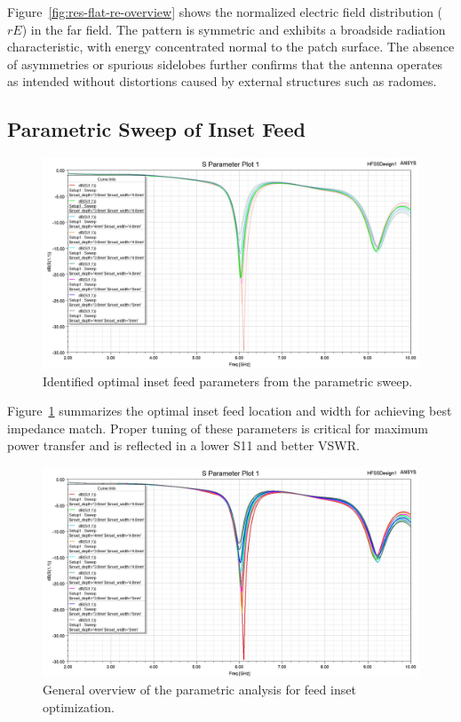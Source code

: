 Figure~\ref{fig:res-flat-re-overview} shows the normalized electric field distribution ($rE$) in the far field. The pattern is symmetric and exhibits a broadside radiation characteristic, with energy concentrated normal to the patch surface. The absence of asymmetries or spurious sidelobes further confirms that the antenna operates as intended without distortions caused by external structures such as radomes.

\subsection{Parametric Sweep of Inset Feed}

\begin{figure}[H]
    \centering
    \includegraphics[width=1.0\textwidth]{figures/parametric_sweep/best parameter.jpeg}
    \caption{Identified optimal inset feed parameters from the parametric sweep.}
    \label{fig:res-param-best}
\end{figure}

Figure~\ref{fig:res-param-best} summarizes the optimal inset feed location and width for achieving best impedance match. Proper tuning of these parameters is critical for maximum power transfer and is reflected in a lower S11 and better VSWR.

\begin{figure}[H]
    \centering
    \includegraphics[width=1.0\textwidth]{figures/parametric_sweep/parametric analysis.jpeg}
    \caption{General overview of the parametric analysis for feed inset optimization.}
    \label{fig:res-param-analysis}
\end{figure}

